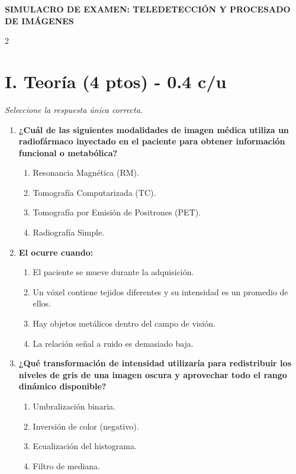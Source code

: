 \documentclass[a4paper,10pt]{extarticle}
\begin{document}
\begin{center}
    {\large \textbf{SIMULACRO DE EXAMEN: TELEDETECCIÓN Y PROCESADO DE IMÁGENES}}\\
\end{center}

\begin{multicols*}{2}


\section*{I. Teoría (4 ptos) - 0.4 c/u}
\textit{\footnotesize Seleccione la respuesta única correcta.}

\begin{enumerate}

    \item \textbf{¿Cuál de las siguientes modalidades de imagen médica utiliza un radiofármaco inyectado en el paciente para obtener información funcional o metabólica?}
    \begin{enumerate}[label=\alph*)]
        \item Resonancia Magnética (RM).
        \item Tomografía Computarizada (TC).
        \item Tomografía por Emisión de Positrones (PET).
        \item Radiografía Simple.
    \end{enumerate}

    \item \textbf{El  ocurre cuando:}
    \begin{enumerate}[label=\alph*)]
        \item El paciente se mueve durante la adquisición.
        \item Un vóxel contiene tejidos diferentes y su intensidad es un promedio de ellos.
        \item Hay objetos metálicos dentro del campo de visión.
        \item La relación señal a ruido es demasiado baja.
    \end{enumerate}

    \item \textbf{¿Qué transformación de intensidad utilizaría para redistribuir los niveles de gris de una imagen oscura y aprovechar todo el rango dinámico disponible?}
    \begin{enumerate}[label=\alph*)]
        \item Umbralización binaria.
        \item Inversión de color (negativo).
        \item Ecualización del histograma.
        \item Filtro de mediana.
    \end{enumerate}


\end{enumerate}
\end{multicols*}
\end{document}
